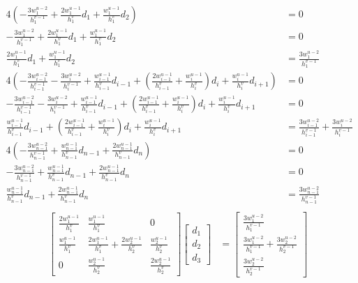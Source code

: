 \documentclass{article}
\begin{document}
\begin{align*}
  4\left(-\frac{3w_1^{u-2}}{h_1^{v-1}}+\frac{2w_1^{u-1}}{h_1^v}d_1+\frac{w_1^{u-1}}{h_1^v}d_2\right)
  &= 0 \\
  -\frac{3w_1^{u-2}}{h_1^{v-1}}+\frac{2w_1^{u-1}}{h_1^v}d_1+\frac{w_1^{u-1}}{h_1^v}d_2
  &= 0 \\
  \frac{2w_1^{u-1}}{h_1^v}d_1+\frac{w_1^{u-1}}{h_1^v}d_2
  &= \frac{3w_1^{u-2}}{h_1^{v-1}} \\
  4\left(
  -\frac{3w_{i-1}^{u-2}}{h_{i-1}^{v-1}}-\frac{3w_i^{u-2}}{h_i^{v-1}}
  +\frac{w_{i-1}^{u-1}}{h_{i-1}^v}d_{i-1}
  +\left(\frac{2w_{i-1}^{u-1}}{h_{i-1}^v}+\frac{w_i^{u-1}}{h_i^v}\right)d_i
  +\frac{w_i^{u-1}}{h_i^v}d_{i+1}
  \right)
  &= 0 \\
  -\frac{3w_{i-1}^{u-2}}{h_{i-1}^{v-1}}-\frac{3w_i^{u-2}}{h_i^{v-1}}
  +\frac{w_{i-1}^{u-1}}{h_{i-1}^v}d_{i-1}
  +\left(\frac{2w_{i-1}^{u-1}}{h_{i-1}^v}+\frac{w_i^{u-1}}{h_i^v}\right)d_i
  +\frac{w_i^{u-1}}{h_i^v}d_{i+1}
  &= 0 \\
  \frac{w_{i-1}^{u-1}}{h_{i-1}^v}d_{i-1}
  +\left(\frac{2w_{i-1}^{u-1}}{h_{i-1}^v}+\frac{w_i^{u-1}}{h_i^v}\right)d_i
  +\frac{w_i^{u-1}}{h_i^v}d_{i+1}
  &= \frac{3w_{i-1}^{u-2}}{h_{i-1}^{v-1}}+\frac{3w_i^{u-2}}{h_i^{v-1}} \\
  4\left(-\frac{3w_{n-1}^{u-2}}{h_{n-1}^{v-1}}+\frac{w_{n-1}^{u-1}}{h_{n-1}^v}d_{n-1}+\frac{2w_{n-1}^{u-1}}{h_{n-1}^v}d_n\right)
  &= 0 \\
  -\frac{3w_{n-1}^{u-2}}{h_{n-1}^{v-1}}+\frac{w_{n-1}^{u-1}}{h_{n-1}^v}d_{n-1}+\frac{2w_{n-1}^{u-1}}{h_{n-1}^v}d_n
  &= 0 \\
  \frac{w_{n-1}^{u-1}}{h_{n-1}^v}d_{n-1}+\frac{2w_{n-1}^{u-1}}{h_{n-1}^v}d_n
  &= \frac{3w_{n-1}^{u-2}}{h_{n-1}^{v-1}} \\
\end{align*}
\begin{align*}
  \begin{bmatrix}
    \frac{2w_1^{u-1}}{h_1^v} & \frac{w_1^{u-1}}{h_1^v} & 0 \\
    \frac{w_1^{u-1}}{h_1^v} & \frac{2w_1^{u-1}}{h_1^v}+\frac{2w_2^{u-1}}{h_2^v} & \frac{w_2^{u-1}}{h_2^v} \\
    0 & \frac{w_2^{u-1}}{h_2^v} & \frac{2w_2^{u-1}}{h_2^v}
  \end{bmatrix}
  \begin{bmatrix}
    d_1 \\ d_2 \\ d_3
  \end{bmatrix}
  &= 
  \begin{bmatrix}
    \frac{3w_1^{u-2}}{h_1^{v-1}} \\
    \frac{3w_1^{u-2}}{h_1^{v-1}}+\frac{3w_2^{u-2}}{h_2^{v-1}} \\
    \frac{3w_2^{u-2}}{h_2^{v-1}}
  \end{bmatrix}
\end{align*}
\end{document}
